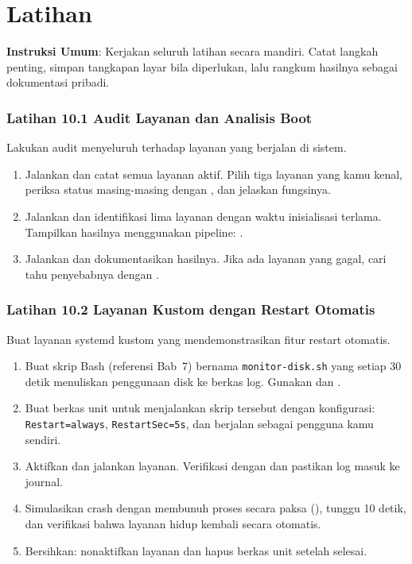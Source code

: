 \section{Latihan}
\label{sec:latihan-layanan}

\textbf{Instruksi Umum}: Kerjakan seluruh latihan secara mandiri. Catat langkah penting, simpan tangkapan layar bila diperlukan, lalu rangkum hasilnya sebagai dokumentasi pribadi.

\subsubsection*{Latihan 10.1 Audit Layanan dan Analisis Boot}
Lakukan audit menyeluruh terhadap layanan yang berjalan di sistem.
\begin{enumerate}
    \item Jalankan  dan catat semua layanan aktif. Pilih tiga layanan yang kamu kenal, periksa status masing-masing dengan , dan jelaskan fungsinya.
    \item Jalankan  dan identifikasi lima layanan dengan waktu inisialisasi terlama. Tampilkan hasilnya menggunakan pipeline: .
\item Jalankan  dan dokumentasikan hasilnya. Jika ada layanan yang gagal, cari tahu penyebabnya dengan .
\end{enumerate}

\subsubsection*{Latihan 10.2 Layanan Kustom dengan Restart Otomatis}
Buat layanan systemd kustom yang mendemonstrasikan fitur restart otomatis.
\begin{enumerate}
    \item Buat skrip Bash (referensi Bab~7) bernama \texttt{monitor-disk.sh} yang setiap 30 detik menuliskan penggunaan disk ke berkas log. Gunakan  dan .
    \item Buat berkas unit  untuk menjalankan skrip tersebut dengan konfigurasi: \texttt{Restart=always}, \texttt{RestartSec=5s}, dan berjalan sebagai pengguna kamu sendiri.
    \item Aktifkan dan jalankan layanan. Verifikasi dengan  dan pastikan log masuk ke journal.
    \item Simulasikan crash dengan membunuh proses secara paksa (), tunggu 10 detik, dan verifikasi bahwa layanan hidup kembali secara otomatis.
\item Bersihkan: nonaktifkan layanan dan hapus berkas unit setelah selesai.
\end{enumerate}

